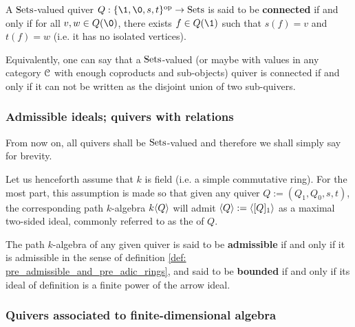             \begin{definition} \label{def: connected_quivers}
                A $\mathrm{Sets}$-valued quiver $Q: \{\1, \0, s, t\}^{\op} \to \Sets$ is said to be \textbf{connected} if and only if for all $v, w \in Q(\0)$, there exists $f \in Q(\1)$ such that $s(f) = v$ and $t(f) = w$ (i.e. it has no isolated vertices).
            \end{definition}
            \begin{remark}
                Equivalently, one can say that a $\mathrm{Sets}$-valued (or maybe with values in any category $\mathcal{C}$ with enough coproducts and sub-objects) quiver is connected if and only if it can not be written as the disjoint union of two sub-quivers. 
            \end{remark}
            
        \subsubsection{Admissible ideals; quivers with relations}
            \begin{convention}
                From now on, all quivers shall be $\mathrm{Sets}$-valued and therefore we shall simply say  for brevity.
            \end{convention}
            \begin{convention}
                Let us henceforth assume that $k$ is field (i.e. a simple commutative ring). For the most part, this assumption is made so that given any quiver $Q := (Q_1, Q_0, s, t)$, the corresponding path $k$-algebra $k\langle Q\rangle$ will admit $\langle Q\rangle := \langle[Q]_1\rangle$ as a maximal two-sided ideal, commonly referred to as the  of $Q$.
            \end{convention}
            
            \begin{definition} \label{def: admissible_ideals_of_path_algebras}
                The path $k$-algebra of any given quiver is said to be \textbf{admissible} if and only if it is admissible in the sense of definition \ref{def: pre_admissible_and_pre_adic_rings}, and said to be \textbf{bounded} if and only if its ideal of definition is a finite power of the arrow ideal.
            \end{definition}
            
        \subsubsection{Quivers associated to finite-dimensional algebra}
        
